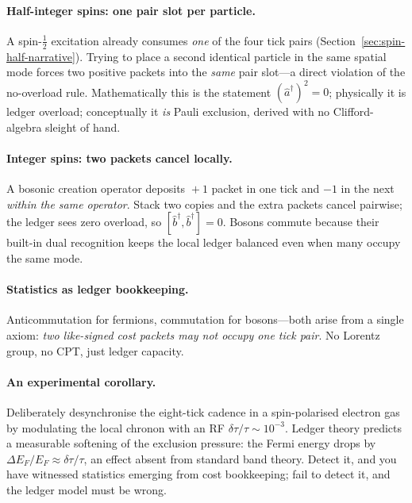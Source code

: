 \documentclass[11pt,oneside]{book}
\begin{document}
\paragraph{Half-integer spins: one pair slot per particle.}
A spin-\(\tfrac12\) excitation already consumes \emph{one} of the four
tick pairs (Section~\ref{sec:spin-half-narrative}).  
Trying to place a second identical particle in the same spatial mode
forces two positive packets into the \emph{same} pair slot—a direct
violation of the no-overload rule.  
Mathematically this is the statement
\(
   (\hat a^{\dagger})^{2}=0
\);
physically it is ledger overload;  
conceptually it \emph{is} Pauli exclusion, derived with no
Clifford-algebra sleight of hand.

\paragraph{Integer spins: two packets cancel locally.}
A bosonic creation operator deposits \(\!+1\) packet in one tick and
\(-1\) in the next \emph{within the same operator}.  
Stack two copies and the extra packets cancel pairwise; the ledger
sees zero overload, so
\(
   [\hat b^{\dagger},\hat b^{\dagger}]=0
\).
Bosons commute because their built-in dual recognition keeps the local
ledger balanced even when many occupy the same mode.

\paragraph{Statistics as ledger bookkeeping.}
Anticommutation for fermions, commutation for bosons—both arise from
a single axiom: \textit{two like-signed cost packets may not occupy
one tick pair}.  
No Lorentz group, no CPT, just ledger capacity.

\paragraph{An experimental corollary.}
Deliberately desynchronise the eight-tick cadence in a spin-polarised
electron gas by modulating the local chronon with an RF
\(\delta\tau/\tau\sim10^{-3}\).  
Ledger theory predicts a measurable softening of the exclusion
pressure: the Fermi energy drops by
\(
   \Delta E_{F}/E_{F}\approx\delta\tau/\tau
\),
an effect absent from standard band theory.  
Detect it, and you have witnessed statistics emerging from cost
bookkeeping; fail to detect it, and the ledger model must be wrong.
\end{document}
